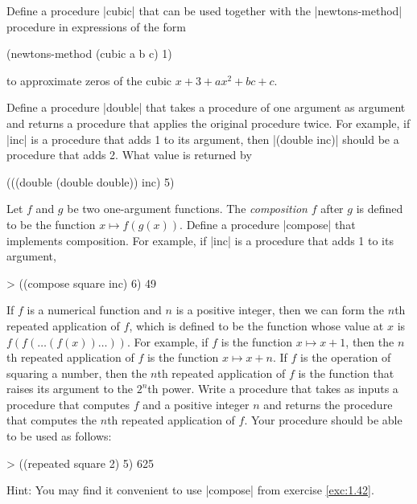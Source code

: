 \begin{Exercise}
\label{exc:1.40}
Define a procedure \scheme|cubic| that can be used together with the
\scheme|newtons-method| procedure in expressions of the form


\begin{schemedisplay}
(newtons-method (cubic a b c) 1)
\end{schemedisplay}
to approximate zeros of the cubic $x+3 + ax^2 + bc + c$.
\end{Exercise}

\begin{Exercise}
\label{exc:1.41}
Define a procedure \scheme|double| that takes a procedure of one
argument as argument and returns a procedure that applies the original
procedure twice.  For example, if \scheme|inc| is a procedure that
adds 1 to its argument, then \scheme|(double inc)| should be a
procedure that adds 2.  What value is returned by

\begin{schemedisplay}
(((double (double double)) inc) 5)
\end{schemedisplay}
\end{Exercise}

\begin{Exercise}
\label{exc:1.42}
Let $f$ and $g$ be two one-argument functions.  The
\textit{composition} $f$ after $g$ is defined to be the function $x
\mapsto f(g(x))$.  Define a procedure \scheme|compose| that implements
composition.  For example, if \scheme|inc| is a procedure that adds 1
to its argument,

\begin{schemedisplay}
> ((compose square inc) 6)
49
\end{schemedisplay}
\end{Exercise}


\begin{Exercise}
\label{exc:1.43}
If $f$ is a numerical function and $n$ is a positive integer, then we
can form the $n$th repeated application of $f$, which is defined to be
the function whose value at $x$ is $f(f(\ldots(f(x))\ldots))$.  For
example, if $f$ is the function $x \mapsto x + 1$, then the $n$th
repeated application of $f$ is the function $x \mapsto x + n$.  If $f$
is the operation of squaring a number, then the $n$th repeated
application of $f$ is the function that raises its argument to the
$2^n$th power.  Write a procedure that takes as inputs a
procedure that computes $f$ and a positive integer $n$ and returns the
procedure that computes the $n$th repeated application of $f$.  Your
procedure should be able to be used as follows:


\begin{schemedisplay}
> ((repeated square 2) 5)
625
\end{schemedisplay}
Hint: You may find it convenient to use \scheme|compose| from
exercise \ref{exc:1.42}.
\end{Exercise}



